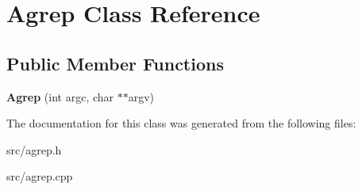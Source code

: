 \hypertarget{class_agrep}{\section{Agrep Class Reference}
\label{class_agrep}
}
\subsection*{Public Member Functions}
\begin{DoxyCompactItemize}
\item 
\hypertarget{class_agrep_ac55d00aa6cd82b406a58326ba9ee1802}{{\bfseries Agrep} (int argc, char $\ast$$\ast$argv)}\label{class_agrep_ac55d00aa6cd82b406a58326ba9ee1802}

\end{DoxyCompactItemize}


The documentation for this class was generated from the following files\-:\begin{DoxyCompactItemize}
\item 
src/agrep.\-h\item 
src/agrep.\-cpp\end{DoxyCompactItemize}
